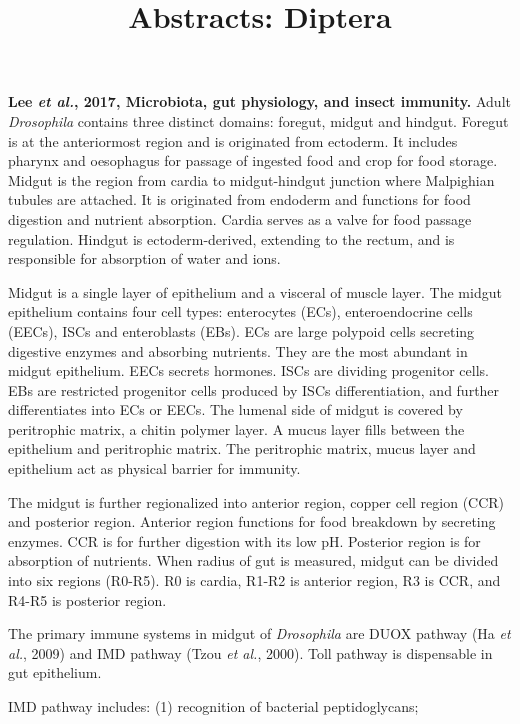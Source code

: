 \documentclass[11pt]{article}
\title{Abstracts: Diptera}
\author{}
\date{}
\begin{document}
\begin{sloppypar}
  \maketitle

  \linenumbers
\textbf{Lee \textit{et al.}, 2017, Microbiota, gut physiology, and insect immunity.}
Adult \textit{Drosophila} contains three distinct domains: foregut, midgut and hindgut. 
Foregut is at the anteriormost region and is originated from ectoderm. 
It includes pharynx and oesophagus for passage of ingested food and crop for food storage. 
Midgut is the region from cardia to midgut-hindgut junction where Malpighian tubules are attached. 
It is originated from endoderm and functions for food digestion and nutrient absorption. 
Cardia serves as a valve for food passage regulation. 
Hindgut is ectoderm-derived, extending to the rectum, and is responsible for absorption of water and ions.
\par
Midgut is a single layer of epithelium and a visceral of muscle layer. 
The midgut epithelium contains four cell types: enterocytes (ECs), enteroendocrine cells (EECs), ISCs and enteroblasts (EBs). 
ECs are large polypoid cells secreting digestive enzymes and absorbing nutrients. 
They are the most abundant in midgut epithelium. 
EECs secrets hormones. 
ISCs are dividing progenitor cells. 
EBs are restricted progenitor cells produced by ISCs differentiation, and further differentiates into ECs or EECs. 
The lumenal side of midgut is covered by peritrophic matrix, a chitin polymer layer. 
A mucus layer fills between the epithelium and peritrophic matrix. 
The peritrophic matrix, mucus layer and epithelium act as physical barrier for immunity. 
\par
The midgut is further regionalized into anterior region, copper cell region (CCR) and posterior region. 
Anterior region functions for food breakdown by secreting enzymes. 
CCR is for further digestion with its low pH. 
Posterior region is for absorption of nutrients. 
When radius of gut is measured, midgut can be divided into six regions (R0-R5). 
R0 is cardia, R1-R2 is anterior region, R3 is CCR, and R4-R5 is posterior region. 
\par
The primary immune systems in midgut of \textit{Drosophila} are DUOX pathway (Ha \textit{et al.}, 2009) and IMD pathway (Tzou \textit{et al.}, 2000). 
Toll pathway is dispensable in gut epithelium.
\par
IMD pathway includes: 
(1) recognition of bacterial peptidoglycans; 

\end{sloppypar}
\end{document}

